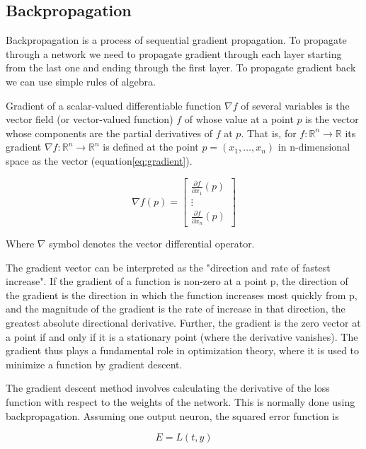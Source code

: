 \subsection{Backpropagation}

Backpropagation is a process of sequential gradient propagation. To propagate through a network we need to propagate gradient through each layer starting from the last one and ending through the first layer. To propagate gradient back we can use simple rules of algebra.

Gradient of a scalar-valued differentiable function $\nabla f$ of several variables is the vector field (or vector-valued function) $f$ of whose value at a point $p$ is the vector whose components are the partial derivatives of $f$ at $p$. That is, for $f\colon \mathbb {R} ^{n}\to \mathbb {R}$ its gradient $\nabla f\colon \mathbb {R} ^{n}\to \mathbb {R} ^{n}$ is defined at the point $p=(x_{1},\ldots ,x_{n})$ in n-dimensional space as the vector (equation\ref{eq:gradient}).

\begin{equation}
    \label{eq:gradient}
    \nabla f(p)=
    \begin{bmatrix}{
        \frac {\partial f}{\partial x_{1}}}(p) \\\vdots \\{\frac {\partial f}{\partial x_{n}}}(p)
    \end{bmatrix}
\end{equation}

Where $\nabla$ symbol denotes the vector differential operator.

The gradient vector can be interpreted as the "direction and rate of fastest increase". If the gradient of a function is non-zero at a point p, the direction of the gradient is the direction in which the function increases most quickly from p, and the magnitude of the gradient is the rate of increase in that direction, the greatest absolute directional derivative. Further, the gradient is the zero vector at a point if and only if it is a stationary point (where the derivative vanishes). The gradient thus plays a fundamental role in optimization theory, where it is used to minimize a function by gradient descent.

The gradient descent method involves calculating the derivative of the loss function with respect to the weights of the network. This is normally done using backpropagation. Assuming one output neuron, the squared error function is

\begin{equation}
    \label{eq:gradient_error}
    E=L(t,y)
\end{equation}

